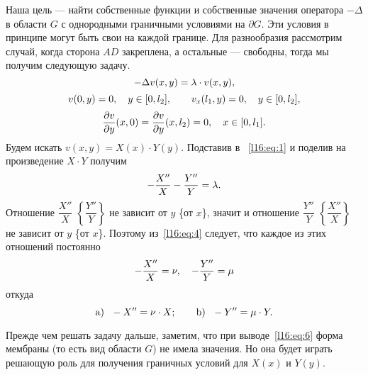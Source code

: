 Наша цель --- найти собственные функции и собственные значения оператора $-\Delta$ в области $G$ с однородными граничными условиями на $\partial G$. Эти условия в принципе могут быть свои на каждой границе. Для разнообразия рассмотрим случай, когда сторона $AD$ закреплена, а остальные --- свободны, тогда мы получим следующую задачу.
\begin{equation}\label{l16:eq:1}
	\hfill-\Delta v(x,y)=\lambda\cdot v(x,y),\hfill
\end{equation}  
\begin{equation}\label{l16:eq:2}
	\hfill v(0,y)=0,\quad y\in[0,l_2],\qquad v_x(l_1,y)=0,\quad y\in[0,l_2],\hfill
\end{equation}
\begin{equation}\label{l16:eq:3}
	\hfill \pder{v}{y}(x,0)=\pder{v}{y}(x,l_2)=0,\quad  x\in[0,l_1].\hfill
\end{equation}
Будем искать $v(x,y)=X(x)\cdot Y(y)$. Подставив в ~\eqref{l16:eq:1} и поделив на произведение $X\cdot Y$ получим 
\begin{equation}\label{l16:eq:4}
	\hfill-\frac{X''}{X}-\frac{Y''}{Y}=\lambda.\hfill
\end{equation}
Отношение $\dfrac{X''}{X}$ $\left\{\dfrac{Y''}{Y}\right\}$ не зависит от $y$ \{от $x$\}, значит и отношение $\dfrac{Y''}{Y}$ $\left\{\dfrac{X''}{X}\right\}$ не зависит от $y$ \{от $x$\}. Поэтому из~\eqref{l16:eq:4} следует, что каждое из этих отношений постоянно
\begin{equation}\label{l16:eq:5}
	\hfill-\frac{X''}{X}=\nu,\quad-\frac{Y''}{Y}=\mu\hfill
\end{equation} 
откуда
\begin{equation}\label{l16:eq:6}
	\hfill\text{a)}\ \ -X''=\nu\cdot X;\qquad\text{b)}\ \ -Y''=\mu\cdot Y.\hfill
\end{equation}

Прежде чем решать задачу дальше, заметим, что при выводе~\eqref{l16:eq:6} форма мембраны (то есть вид области $G$) не имела значения. Но она будет играть решающую роль для получения граничных условий для $X(x)$ и $Y(y)$.

